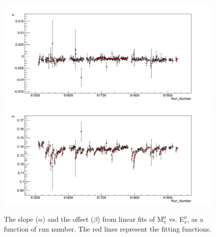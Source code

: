 \begin{figure}[tbp]
\centering
\includegraphics[scale=0.33]{fig_simulation/Alpha_RunNumber_before_corr.png}
\includegraphics[scale=0.33]{fig_simulation/Beta_RunNumber_before_corr.png}
\caption{The slope ($\alpha$) and the offset ($\beta$) from linear fits of M$_\pi^{0}$ vs. E$_\pi^{0}$, as a function of run number. The red lines represent the fitting functions.} 
\label{fig:ic_alpha_beta_fitting}
\end{figure}

